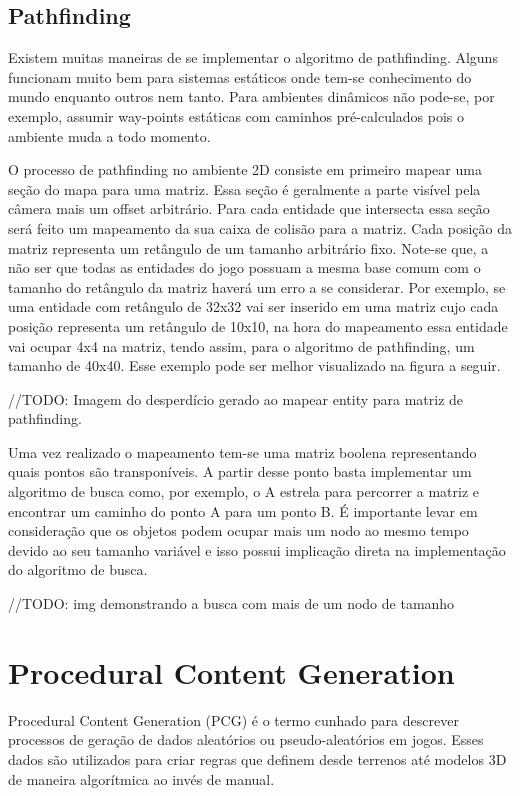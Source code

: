 \documentclass[12pt, 
openright, 
oneside, 
a4paper,    
brazil]{facom-ufu-abntex2}
\begin{document}
\section{Pathfinding}
Existem muitas maneiras de se implementar o algoritmo de pathfinding. Alguns funcionam muito bem para sistemas estáticos onde tem-se conhecimento do mundo enquanto outros nem tanto. Para ambientes dinâmicos não pode-se, por exemplo, assumir way-points estáticas com caminhos pré-calculados pois o ambiente muda a todo momento.

O processo de pathfinding no ambiente 2D consiste em primeiro mapear uma seção do mapa para uma matriz. Essa seção é geralmente a parte visível pela câmera mais um offset arbitrário. Para cada entidade que intersecta essa seção será feito um mapeamento da sua caixa de colisão para a matriz. Cada posição da matriz representa um retângulo de um tamanho arbitrário fixo. Note-se que, a não ser que todas as entidades do jogo possuam a mesma base comum com o tamanho do retângulo da matriz haverá um erro a se considerar. Por exemplo, se uma entidade com retângulo de 32x32 vai ser inserido em uma matriz cujo cada posição representa um retângulo de 10x10, na hora do mapeamento essa entidade vai ocupar 4x4 na matriz, tendo assim, para o algoritmo de pathfinding, um tamanho de 40x40. Esse exemplo pode ser melhor visualizado na figura a seguir.

//TODO: Imagem do desperdício gerado ao mapear entity para matriz de pathfinding.

Uma vez realizado o mapeamento tem-se uma matriz boolena representando quais pontos são transponíveis. A partir desse ponto basta implementar um algoritmo de busca como, por exemplo, o A estrela para percorrer a matriz e encontrar um caminho do ponto A para um ponto B. É importante levar em consideração que os objetos podem ocupar mais um nodo ao mesmo tempo devido ao seu tamanho variável e isso possui implicação direta na implementação do algoritmo de busca.

//TODO: img demonstrando a busca com mais de um nodo de tamanho

\chapter{Procedural Content Generation}
Procedural Content Generation (PCG) é o termo cunhado para descrever processos de geração de dados aleatórios ou pseudo-aleatórios em jogos. Esses dados são utilizados para criar regras que definem desde terrenos até modelos 3D de maneira algorítmica ao invés de manual.
\end{document}

